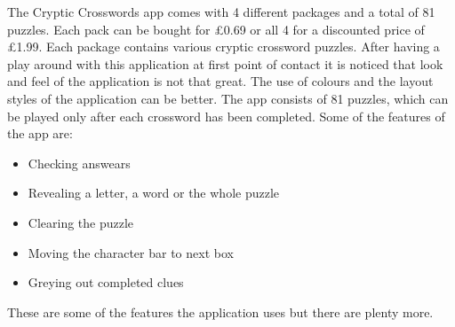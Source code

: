 The Cryptic Crosswords app comes with 4 different packages and a total of 81
puzzles. Each pack can be bought for \pounds0.69 or all 4 for a discounted price
of \pounds1.99. Each package contains various cryptic crossword puzzles. After
having a play around with this application at first point of contact it is
noticed that look and feel of the application is not that great. The use of
colours and the layout styles of the application can be better. The app consists
of 81 puzzles, which can be played only after each crossword has been completed.
Some of the features of the app are:

\begin{itemize}
    \item Checking answears
    \item Revealing a letter, a word or the whole puzzle
    \item Clearing the puzzle
    \item Moving the character bar to next box
    \item Greying out completed clues
\end{itemize}

These are some of the features the application uses but there are plenty more.